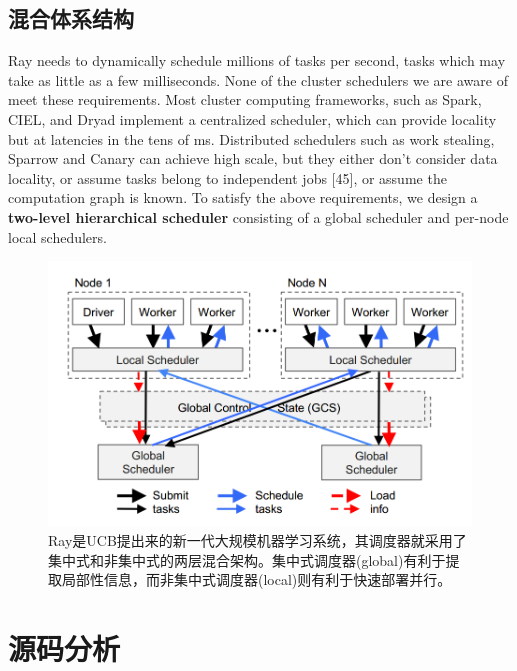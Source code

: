 \documentclass[logo,reportComp]{thesis}
\begin{document}
\subsection{混合体系结构}
\begin{flushleft}
Ray needs to dynamically schedule millions of tasks per second, tasks which may take as little as a few milliseconds. None of the cluster schedulers we are aware of meet these requirements.
Most cluster computing frameworks, such as Spark, CIEL, and Dryad implement a centralized scheduler, which can provide locality but at latencies in the tens of ms. Distributed schedulers such as work stealing, Sparrow and Canary can achieve high scale, but they either don’t consider data locality, or assume tasks belong to independent jobs [45], or assume the computation graph is known.
To satisfy the above requirements, we design a \textbf{two-level hierarchical scheduler} consisting of a global scheduler and per-node local schedulers.
\end{flushleft}
\begin{figure}[H]
\centering
\includegraphics[width=0.8\linewidth]{fig/ray.png}
\caption{Ray\cite{bib:ray}是UCB提出来的新一代大规模机器学习系统，其调度器就采用了集中式和非集中式的两层混合架构。集中式调度器(global)有利于提取局部性信息，而非集中式调度器(local)则有利于快速部署并行。}
\end{figure}

\section{源码分析}
\end{document}
